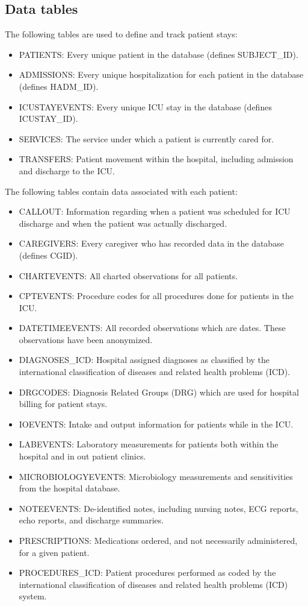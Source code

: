 \documentclass[english]{article}
\begin{document}
\subsection*{Data tables}

The following tables are used to define and track patient stays:

\begin{itemize}
  \item PATIENTS: Every unique patient in the database (defines SUBJECT\_ID).
  \item ADMISSIONS: Every unique hospitalization for each patient in the database (defines HADM\_ID).
  \item ICUSTAYEVENTS: Every unique ICU stay in the database (defines ICUSTAY\_ID).
  \item SERVICES: The service under which a patient is currently cared for.
  \item TRANSFERS: Patient movement within the hospital, including admission and discharge to the ICU.
\end{itemize}

The following tables contain data associated with each patient:

\begin{itemize}
  \item CALLOUT: Information regarding when a patient was scheduled for ICU discharge and when the patient was actually discharged.
  \item CAREGIVERS: Every caregiver who has recorded data in the database (defines CGID).
  \item CHARTEVENTS: All charted observations for all patients.
  \item CPTEVENTS: Procedure codes for all procedures done for patients in the ICU.
  \item DATETIMEEVENTS: All recorded observations which are dates. These observations have been anonymized.
  \item DIAGNOSES\_ICD: Hospital assigned diagnoses as classified by the international classification of diseases and related health problems (ICD).
  \item DRGCODES: Diagnosis Related Groups (DRG) which are used for hospital billing for patient stays.
  \item IOEVENTS: Intake and output information for patients while in the ICU.
  \item LABEVENTS: Laboratory measurements for patients both within the hospital and in out patient clinics.
  \item MICROBIOLOGYEVENTS: Microbiology measurements and sensitivities from the hospital database.
  \item NOTEEVENTS: De-identified notes, including nursing notes, ECG reports, echo reports, and discharge summaries.
  \item PRESCRIPTIONS: Medications ordered, and not necessarily administered, for a given patient.
  \item PROCEDURES\_ICD: Patient procedures performed as coded by the international classification of diseases and related health problems (ICD) system.
\end{itemize}
\end{document}
